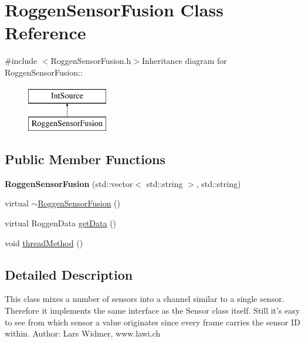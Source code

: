\hypertarget{classRoggenSensorFusion}{
\section{RoggenSensorFusion Class Reference}
\label{classRoggenSensorFusion}
}


{\ttfamily \#include $<$RoggenSensorFusion.h$>$}Inheritance diagram for RoggenSensorFusion::\begin{figure}[H]
\begin{center}
\leavevmode
\includegraphics[height=2cm]{classRoggenSensorFusion}
\end{center}
\end{figure}
\subsection*{Public Member Functions}
\begin{DoxyCompactItemize}
\item 
\hypertarget{classRoggenSensorFusion_a8ea10f1fff711e63484450cff7615e91}{
{\bfseries RoggenSensorFusion} (std::vector$<$ std::string $>$, std::string)}
\label{classRoggenSensorFusion_a8ea10f1fff711e63484450cff7615e91}

\item 
virtual \hyperlink{classRoggenSensorFusion_a3f31cc50b5c484ab19713f14fb9c8d10}{$\sim$RoggenSensorFusion} ()
\item 
virtual RoggenData \hyperlink{classRoggenSensorFusion_adbf5ec2917eea50f83ae836213e03c5c}{getData} ()
\item 
void \hyperlink{classRoggenSensorFusion_a2d36e7e447102dbd505440489ebbedbc}{threadMethod} ()
\end{DoxyCompactItemize}


\subsection{Detailed Description}
This class mixes a number of sensors into a channel similar to a single sensor. Therefore it implements the same interface as the Sensor class itself. Still it's easy to see from which sensor a value originates since every frame carries the sensor ID within. Author: Lars Widmer, www.lawi.ch 

